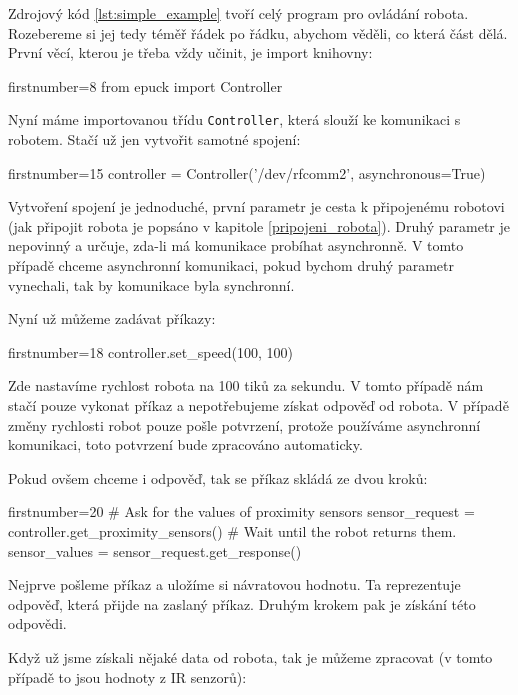     Zdrojový kód \ref{lst:simple_example} tvoří celý program pro ovládání
    robota. Rozebereme si jej tedy téměř řádek po řádku, abychom věděli, co
    která část dělá. První věcí, kterou je třeba vždy učinit, je import
    knihovny:

    \begin{pyc*}{firstnumber=8}
from epuck import Controller
    \end{pyc*}

    Nyní máme importovanou třídu {\tt Controller}, která slouží ke komunikaci s
    robotem. Stačí už jen vytvořit samotné spojení:

    \begin{pyc*}{firstnumber=15}
controller = Controller('/dev/rfcomm2', asynchronous=True)
    \end{pyc*}

    Vytvoření spojení je jednoduché, první parametr je cesta k připojenému
    robotovi (jak připojit robota je popsáno v kapitole
    \ref{pripojeni_robota}). Druhý parametr je nepovinný a určuje, zda-li má
    komunikace probíhat asynchronně. V tomto případě chceme asynchronní
    komunikaci, pokud bychom druhý parametr vynechali, tak by komunikace byla
    synchronní.

    Nyní už můžeme zadávat příkazy:

    \begin{pyc*}{firstnumber=18}
controller.set_speed(100, 100)
    \end{pyc*}

    Zde nastavíme rychlost robota na 100 tiků za sekundu. V tomto případě nám
    stačí pouze vykonat příkaz a nepotřebujeme získat odpověď od robota. V
    případě změny rychlosti robot pouze pošle potvrzení, protože používáme
    asynchronní komunikaci, toto potvrzení bude zpracováno automaticky.

    Pokud ovšem chceme i odpověď, tak se příkaz skládá ze dvou kroků:

    \begin{pyc*}{firstnumber=20}
# Ask for the values of proximity sensors
sensor_request = controller.get_proximity_sensors()
# Wait until the robot returns them.
sensor_values = sensor_request.get_response()
    \end{pyc*}

    Nejprve pošleme příkaz a uložíme si návratovou hodnotu. Ta reprezentuje
    odpověď, která přijde na zaslaný příkaz. Druhým krokem pak je získání této
    odpovědi.

    Když už jsme získali nějaké data od robota, tak je můžeme zpracovat (v
    tomto případě to jsou hodnoty z IR senzorů):

